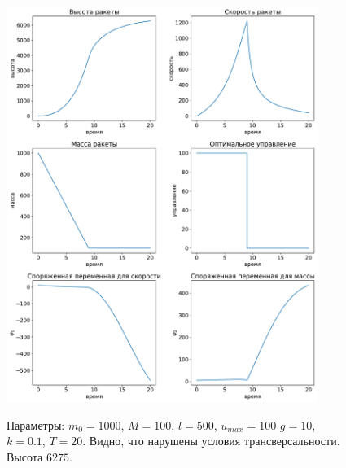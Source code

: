 \documentclass[12pt, a4paper]{article} %
\begin{document}
\begin{figure}[H]
\begin{center}
    \includegraphics[width=0.9\textwidth]{1_1.pdf}
    \label{fig:1_1}
    \caption{Параметры: $m_0=1000$, $M=100$,  $l=500$,  $u_{max}=100$
        $g=10$,  $k=0.1$,  $T=20$.
        Видно, что нарушены условия трансверсальности.
        Высота $6275$.}
\end{center} 
\end{figure} 
\end{document}
